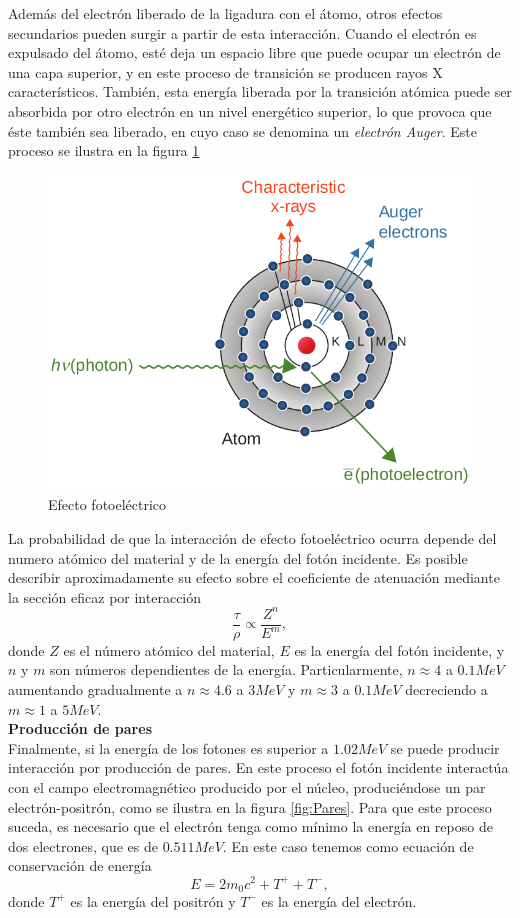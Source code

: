 Además del electrón liberado de la ligadura con el átomo, otros efectos secundarios pueden surgir a partir de esta interacción. Cuando el electrón es expulsado del átomo, esté deja un espacio libre que puede ocupar un electrón de una capa superior, y en este proceso de transición se producen rayos X característicos. También, esta energía liberada por la transición atómica puede ser absorbida por otro electrón en un nivel energético superior, lo que provoca que éste también sea liberado, en cuyo caso se denomina un \textit{electrón Auger}. Este proceso se ilustra en la figura \ref{fig:fotoelectrico}\\
\begin{figure}[H]
	\centering
	\includegraphics[width=0.7\linewidth]{images/fotoelectrico.png}
	\caption{Efecto fotoeléctrico \cite{khan2014the}}
	\label{fig:fotoelectrico}
\end{figure}

La probabilidad de que la interacción de efecto fotoeléctrico ocurra depende del numero atómico del material y de la energía del fotón incidente. Es posible describir aproximadamente su efecto sobre el coeficiente de atenuación mediante la sección eficaz por interacción
\begin{equation}
	\frac{\tau}{\rho}\propto \frac{Z^n}{E^m},
\end{equation} 
donde $Z$ es el número atómico del material, $E$ es la energía del fotón incidente, y $n$ y $m$ son números dependientes de la energía. Particularmente, $n\approx 4$ a $0.1 MeV$ aumentando gradualmente a $n\approx4.6$ a $3 MeV$ y $m\approx3$ a $0.1 MeV$ decreciendo a $m\approx1$ a $5 MeV$\cite{Attix1986}.\\

\textbf{Producción de pares}\\

Finalmente, si la energía de los fotones es superior a $1.02 MeV$ se puede producir interacción por producción de pares. En este proceso el fotón incidente interactúa con el campo electromagnético producido por el núcleo, produciéndose un par electrón-positrón, como se ilustra en la figura \ref{fig:Pares}. Para que este proceso suceda, es necesario que el electrón tenga como mínimo la energía en reposo de dos electrones, que es de $0.511 MeV$. En este caso tenemos como ecuación de conservación de energía
\begin{equation}
	E=2m_0c^2+T^{+}+T^{-},
\end{equation}
donde $T^{+}$ es la energía del positrón y $T^{-}$ es la energía del electrón.\\

